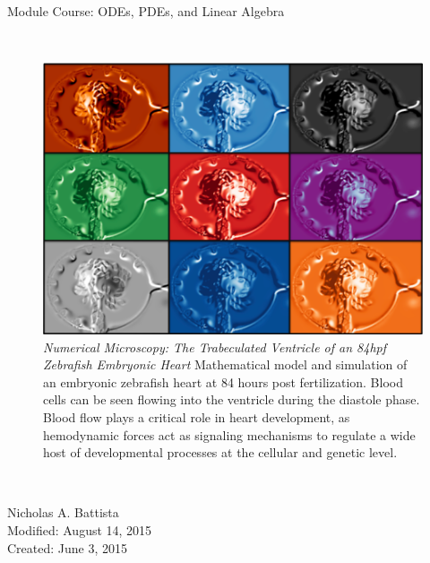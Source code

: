 \documentclass{article}
\begin{document}
\begin{center}
$ $\\
\vspace{0.5in}
\huge Module Course: ODEs, PDEs, and Linear Algebra
\end{center}
$ $\\
\vspace{0.25in}
%
\pagestyle{plain}
\setcounter{page}{1}
%
\begin{figure}[hb] 
\centering 
\includegraphics[width=5.5in]{cover.png} 
\caption[Close up of \textit{Hemidactylus} sp.] {\emph{Numerical Microscopy: The Trabeculated Ventricle of an 84hpf  Zebrafish Embryonic Heart} Mathematical model and simulation of an embryonic zebrafish heart at 84 hours post fertilization. Blood cells can be seen flowing into the ventricle during the diastole phase. Blood flow plays a critical role in heart development, as hemodynamic forces act as signaling mechanisms to regulate a wide host of developmental processes at the cellular and genetic level.} 
\end{figure}
%
$ $\\
\vspace{0.25in}
%
\setcounter{page}{1}
%
\begin{center}
\Large Nicholas A. Battista\\
\Large Modified: August 14, 2015\\
\Large Created: June 3, 2015\\
\end{center}

\newpage

\newpage

\newpage

\newpage

\newpage

\newpage

\end{document}

